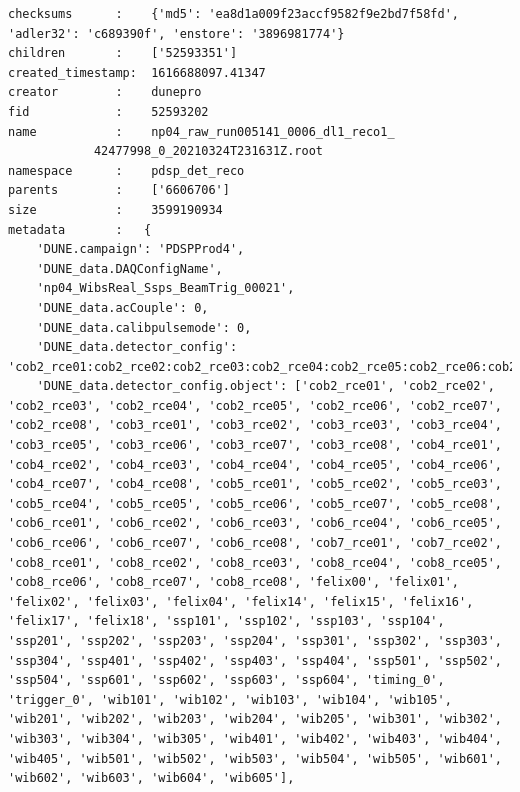\documentclass[../main-v1.tex]{subfiles}
\begin{document}
\begin{verbatim}
checksums      :    {'md5': 'ea8d1a009f23accf9582f9e2bd7f58fd', 'adler32': 'c689390f', 'enstore': '3896981774'}
children       :    ['52593351']
created_timestamp:  1616688097.41347
creator        :    dunepro
fid            :    52593202
name           :    np04_raw_run005141_0006_dl1_reco1_
            42477998_0_20210324T231631Z.root
namespace      :    pdsp_det_reco
parents        :    ['6606706']
size           :    3599190934
metadata       :   {
    'DUNE.campaign': 'PDSPProd4',
    'DUNE_data.DAQConfigName',
    'np04_WibsReal_Ssps_BeamTrig_00021',
    'DUNE_data.acCouple': 0,
    'DUNE_data.calibpulsemode': 0,
    'DUNE_data.detector_config': 'cob2_rce01:cob2_rce02:cob2_rce03:cob2_rce04:cob2_rce05:cob2_rce06:cob2_rce07:cob2_rce08:cob3_rce01:cob3_rce02:cob3_rce03:cob3_rce04:cob3_rce05:cob3_rce06:cob3_rce07:cob3_rce08:cob4_rce01:cob4_rce02:cob4_rce03:cob4_rce04:cob4_rce05:cob4_rce06:cob4_rce07:cob4_rce08:cob5_rce01:cob5_rce02:cob5_rce03:cob5_rce04:cob5_rce05:cob5_rce06:cob5_rce07:cob5_rce08:cob6_rce01:cob6_rce02:cob6_rce03:cob6_rce04:cob6_rce05:cob6_rce06:cob6_rce07:cob6_rce08:cob7_rce01:cob7_rce02:cob8_rce01:cob8_rce02:cob8_rce03:cob8_rce04:cob8_rce05:cob8_rce06:cob8_rce07:cob8_rce08:felix00:felix01:felix02:felix03:felix04:felix14:felix15:felix16:felix17:felix18:ssp101:ssp102:ssp103:ssp104:ssp201:ssp202:ssp203:ssp204:ssp301:ssp302:ssp303:ssp304:ssp401:ssp402:ssp403:ssp404:ssp501:ssp502:ssp504:ssp601:ssp602:ssp603:ssp604:timing_0:trigger_0:wib101:wib102:wib103:wib104:wib105:wib201:wib202:wib203:wib204:wib205:wib301:wib302:wib303:wib304:wib305:wib401:wib402:wib403:wib404:wib405:wib501:wib502:wib503:wib504:wib505:wib601:wib602:wib603:wib604:wib605',
    'DUNE_data.detector_config.object': ['cob2_rce01', 'cob2_rce02', 'cob2_rce03', 'cob2_rce04', 'cob2_rce05', 'cob2_rce06', 'cob2_rce07', 'cob2_rce08', 'cob3_rce01', 'cob3_rce02', 'cob3_rce03', 'cob3_rce04', 'cob3_rce05', 'cob3_rce06', 'cob3_rce07', 'cob3_rce08', 'cob4_rce01', 'cob4_rce02', 'cob4_rce03', 'cob4_rce04', 'cob4_rce05', 'cob4_rce06', 'cob4_rce07', 'cob4_rce08', 'cob5_rce01', 'cob5_rce02', 'cob5_rce03', 'cob5_rce04', 'cob5_rce05', 'cob5_rce06', 'cob5_rce07', 'cob5_rce08', 'cob6_rce01', 'cob6_rce02', 'cob6_rce03', 'cob6_rce04', 'cob6_rce05', 'cob6_rce06', 'cob6_rce07', 'cob6_rce08', 'cob7_rce01', 'cob7_rce02', 'cob8_rce01', 'cob8_rce02', 'cob8_rce03', 'cob8_rce04', 'cob8_rce05', 'cob8_rce06', 'cob8_rce07', 'cob8_rce08', 'felix00', 'felix01', 'felix02', 'felix03', 'felix04', 'felix14', 'felix15', 'felix16', 'felix17', 'felix18', 'ssp101', 'ssp102', 'ssp103', 'ssp104', 'ssp201', 'ssp202', 'ssp203', 'ssp204', 'ssp301', 'ssp302', 'ssp303', 'ssp304', 'ssp401', 'ssp402', 'ssp403', 'ssp404', 'ssp501', 'ssp502', 'ssp504', 'ssp601', 'ssp602', 'ssp603', 'ssp604', 'timing_0', 'trigger_0', 'wib101', 'wib102', 'wib103', 'wib104', 'wib105', 'wib201', 'wib202', 'wib203', 'wib204', 'wib205', 'wib301', 'wib302', 'wib303', 'wib304', 'wib305', 'wib401', 'wib402', 'wib403', 'wib404', 'wib405', 'wib501', 'wib502', 'wib503', 'wib504', 'wib505', 'wib601', 'wib602', 'wib603', 'wib604', 'wib605'],

\end{verbatim}
\end{document}
